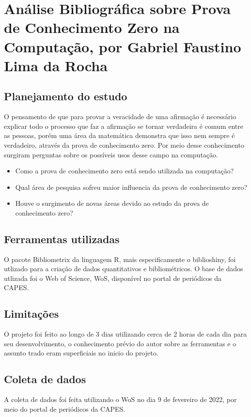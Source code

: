 \chapter{Análise Bibliográfica sobre Prova de Conhecimento Zero na Computação, por Gabriel Faustino Lima da Rocha}

\section{Planejamento do estudo}
O pensamento de que para provar a veracidade de uma afirmação é necessário explicar todo o processo que faz a afirmação se tornar verdadeira é comum entre as pessoas, porém uma área da matemática demonstra que isso nem sempre é verdadeiro, através da prova de conhecimento zero.
Por meio desse conhecimento surgiram perguntas sobre os possíveis usos desse campo na computação.

\begin{itemize}
    \item Como a prova de conhecimento zero está sendo utilizada na computação? 
    \item Qual área de pesquisa sofreu maior influencia da prova de conhecimento zero? 
    \item Houve o surgimento de novas áreas devido ao estudo da prova de conhecimento zero?
\end{itemize}

\section{Ferramentas utilizadas}
O pacote Bibliometrix da linguagem R, mais especificamente o biblioshiny, foi utlizado para a criação de dados quantitativos e bibliométricos. O base de dados utlizada foi o Web of Science, WoS, disponível no portal de periódicos da CAPES.

\section{Limitações}
O projeto foi feito ao longo de 3 dias utilizando cerca de 2 horas de cada dia para seu desenvolvimento, o conhecimento prévio do autor sobre as ferramentas e o assunto trado eram superficiais no inicio do projeto.

\section{Coleta de dados}
A coleta de dados foi feita utilizando o WoS no dia 9 de  fevereiro de 2022, por meio do portal de periódicos da CAPES.

